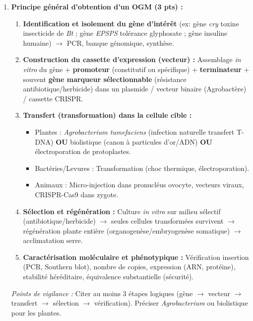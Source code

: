 \documentclass[11pt]{article}
\begin{document}
\begin{corrige}
\begin{enumerate}
\item \textbf{Principe général d'obtention d'un OGM (3 pts) :}
\begin{enumerate}
\item \textbf{Identification et isolement du gène d'intérêt} (ex: gène \emph{cry} toxine insecticide de \emph{Bt} ; gène \emph{EPSPS} tolérance glyphosate ; gène insuline humaine) $\rightarrow$ PCR, banque génomique, synthèse.
\item \textbf{Construction du cassette d'expression (vecteur) :} Assemblage \emph{in vitro} du gène + \textbf{promoteur} (constitutif ou spécifique) + \textbf{terminateur} + souvent \textbf{gène marqueur sélectionnable} (résistance antibiotique/herbicide) dans un plasmide / vecteur binaire (Agrobactère) / cassette CRISPR.
\item \textbf{Transfert (transformation) dans la cellule cible :}
\begin{itemize}
\item Plantes : \emph{Agrobacterium tumefaciens} (infection naturelle transfert T-DNA) \textbf{OU} biolistique (canon à particules d'or/ADN) \textbf{OU} électroporation de protoplastes.
\item Bactéries/Levures : Transformation (choc thermique, électroporation).
\item Animaux : Micro-injection dans pronucléus ovocyte, vecteurs viraux, CRISPR-Cas9 dans zygote.
\end{itemize}
\item \textbf{Sélection et régénération :} Culture \emph{in vitro} sur milieu sélectif (antibiotique/herbicide) $\rightarrow$ seules cellules transformées survivent $\rightarrow$ régénération plante entière (organogenèse/embryogenèse somatique) $\rightarrow$ acclimatation serre.
\item \textbf{Caractérisation moléculaire et phénotypique :} Vérification insertion (PCR, Southern blot), nombre de copies, expression (ARN, protéine), stabilité héréditaire, équivalence substantielle (sécurité).
\end{enumerate}
\textit{Points de vigilance :} Citer au moins 3 étapes logiques (gène $\rightarrow$ vecteur $\rightarrow$ transfert $\rightarrow$ sélection $\rightarrow$ vérification). Préciser \emph{Agrobacterium} ou biolistique pour les plantes.


\end{enumerate}
\end{corrige}
\end{document}
